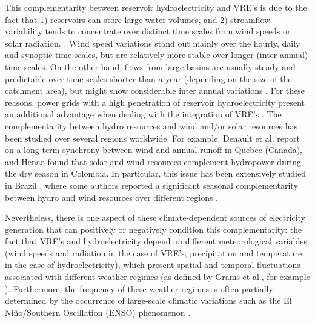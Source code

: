 \documentclass[AMA,Times1COL]{WileyNJDv5} %
\begin{document}
\begin{linenumbers}
This complementarity between reservoir hydroelectricity and VRE's is due to the fact that 1) reservoirs can store large water volumes, and 2) streamflow variability tends to concentrate over distinct time scales from wind speeds or solar radiation. \cite{wan1993factors}. Wind speed variations stand out mainly over the hourly, daily and synoptic time scales, but are relatively more stable over longer (inter annual) time scales. On the other hand, flows from large basins are usually steady and predictable over time scales shorter than a year (depending on the size of the catchment area), but might show considerable inter annual variations \cite{acker2012integration, soberanis2015regarding}. For these reasons, power grids with a high penetration of reservoir hydroelectricity present an additional advantage when dealing with the integration of VRE's \cite{wan1993factors, acker2012integration, gullberg2013political}. The complementarity between hydro resources and wind and/or solar resources has been studied over several regions worldwide. For example, Denault et al. \cite{denault2009complementarity} report on a long-term synchrony between wind and annual runoff in Quebec (Canada), and Henao \cite{henao2020annual} found that solar and wind resources complement hydropower during the dry season in Colombia. In particular, this issue has been extensively studied in Brazil \cite{ricosti2013assessment, schmidt2016optimal}, where some authors reported a significant seasonal complementarity between hydro and wind resources over different regions \cite{do2000wind, silva2016complementarity, cantao2017evaluation}.

Nevertheless, there is one aspect of these climate-dependent sources of electricity generation that can positively or negatively condition this complementarity: the fact that VRE's and hydroelectricity depend on different meteorological variables (wind speeds and radiation in the case of VRE's; precipitation and temperature in the case of hydroelectricity), which present spatial and temporal fluctuations associated with different weather regimes (as defined by Grams et al., for example \cite{grams2017balancing}). Furthermore, the frequency of these weather regimes is often partially determined by the occurrence of large-scale climatic variations such as the El Niño/Southern Oscillation (ENSO) phenomenon \cite{bridgman2014global}. 


\end{linenumbers}
\end{document}
